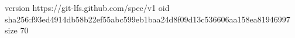 version https://git-lfs.github.com/spec/v1
oid sha256:f93ed4914db58b22ef55abc599eb1baa24d8f09d13c536606aa158ea81946997
size 70
